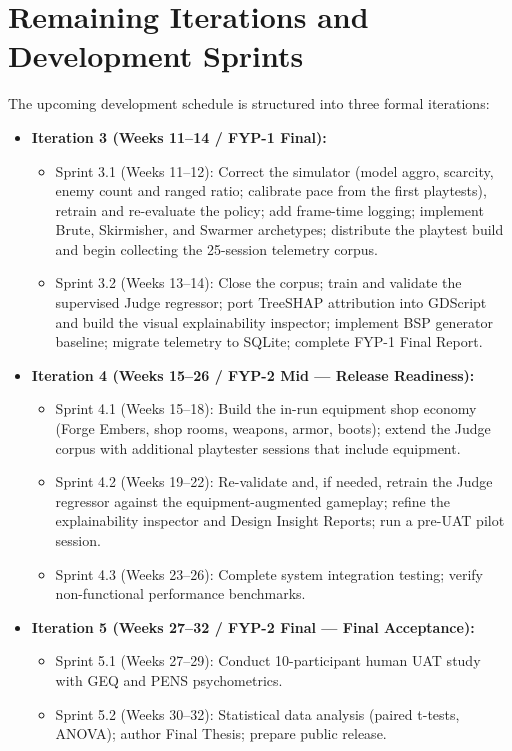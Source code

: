 \section{Remaining Iterations and Development Sprints}
The upcoming development schedule is structured into three formal iterations:
\begin{itemize}
    \item \textbf{Iteration 3 (Weeks 11--14 / FYP-1 Final):}
    \begin{itemize}
        \item Sprint 3.1 (Weeks 11--12): Correct the simulator (model aggro, scarcity, enemy count and ranged ratio; calibrate pace from the first playtests), retrain and re-evaluate the policy; add frame-time logging; implement Brute, Skirmisher, and Swarmer archetypes; distribute the playtest build and begin collecting the 25-session telemetry corpus.
        \item Sprint 3.2 (Weeks 13--14): Close the corpus; train and validate the supervised Judge regressor; port TreeSHAP attribution into GDScript and build the visual explainability inspector; implement BSP generator baseline; migrate telemetry to SQLite; complete FYP-1 Final Report.
    \end{itemize}
    \item \textbf{Iteration 4 (Weeks 15--26 / FYP-2 Mid — Release Readiness):}
    \begin{itemize}
        \item Sprint 4.1 (Weeks 15--18): Build the in-run equipment shop economy (Forge Embers, shop rooms, weapons, armor, boots); extend the Judge corpus with additional playtester sessions that include equipment.
        \item Sprint 4.2 (Weeks 19--22): Re-validate and, if needed, retrain the Judge regressor against the equipment-augmented gameplay; refine the explainability inspector and Design Insight Reports; run a pre-UAT pilot session.
        \item Sprint 4.3 (Weeks 23--26): Complete system integration testing; verify non-functional performance benchmarks.
    \end{itemize}
    \item \textbf{Iteration 5 (Weeks 27--32 / FYP-2 Final — Final Acceptance):}
    \begin{itemize}
        \item Sprint 5.1 (Weeks 27--29): Conduct 10-participant human UAT study with GEQ and PENS psychometrics.
        \item Sprint 5.2 (Weeks 30--32): Statistical data analysis (paired t-tests, ANOVA); author Final Thesis; prepare public release.
    \end{itemize}
\end{itemize}

